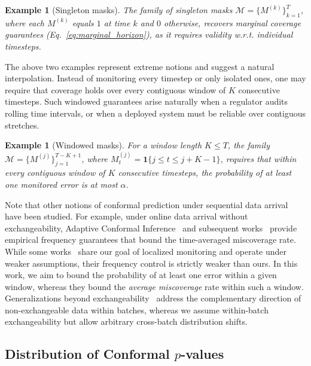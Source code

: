 \documentclass{uai2026} %
\newtheorem{example}[theorem]{Example}
\newcommand{\1}{\mathbf{1}}
\newcommand{\ind}[1]{\mathbf{1}\{#1\}}
\newcommand{\mcal}{\mathcal{M}}
\begin{document}
\begin{example}[Singleton masks]
  The family of singleton masks $\mcal = \{ M^{(k)} \}_{k=1}^T$, where each $M^{(k)}$ equals $1$ at time $k$ and $0$ otherwise, recovers marginal coverage guarantees (Eq.~\ref{eq:marginal_horizon}), as it requires validity w.r.t. individual timesteps.
\end{example}

The above two examples represent extreme notions and suggest a natural interpolation. Instead of monitoring every timestep or only isolated ones, one may require that coverage holds over every contiguous window of $K$ consecutive timesteps. Such windowed guarantees arise naturally when a regulator audits rolling time intervals, or when a deployed system must be reliable over contiguous stretches.

\begin{example}[Windowed masks]
  For a window length $K \le T$, the family $\mcal = \{ M^{(j)} \}_{j=1}^{T-K+1}$, where $M^{(j)}_t = \ind{j \le t \le j+K-1}$, requires that within every contiguous window of $K$ consecutive timesteps, the probability of at least one monitored error is at most $\alpha$.
\end{example}


Note that other notions of conformal prediction under sequential data arrival have been studied. For example, under online data arrival without exchangeability, Adaptive Conformal Inference~\citep{gibbs2021adaptive} and subsequent works~\citep{bhatnagar2023improved,zaffran2022adaptive,gibbs2024conformal, angelopoulos2023conformal} provide empirical frequency guarantees that bound the time-averaged miscoverage rate. While some works~\citep{bhatnagar2023improved} share our goal of localized monitoring and operate under weaker assumptions, their frequency control is strictly weaker than ours. In this work, we aim to bound the probability of at least one error within a given window, whereas they bound the \textit{average miscoverage} rate within such a window. Generalizations beyond exchangeability~\citep{barber2023conformal} address the complementary direction of non-exchangeable data within batches, whereas we assume within-batch exchangeability but allow arbitrary cross-batch distribution shifts.


\subsection{Distribution of Conformal \texorpdfstring{$p$}{p}-values}
\label{sec:distribution-pvalues}
\end{document}
